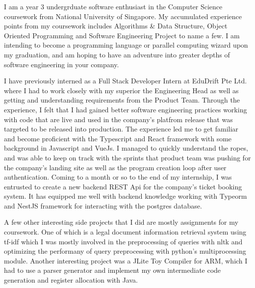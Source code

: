 \documentclass[11pt, a4paper]{awesome-cv}
\begin{document}
\makecvheader[R]


\makelettertitle

\begin{cvletter}

I am a year 3 undergrduate software enthusiast in the Computer Science coursework from National University of Singapore. My accumulated experience points from my coursework includes Algorithms \& Data Structure, Object Oriented Programming and Software Engineering Project to name a few. I am intending to become a programming language or parallel computing wizard upon my graduation, and am hoping to have an adventure into greater depths of software engineering in your company.

I have previously interned as a Full Stack Developer Intern at EduDrift Pte Ltd. where I had to work closely with my superior the Engineering Head as well as getting and understanding requirements from the Product Team. Through the experience, I felt that I had gained better software engineering practices working with code that are live and used in the company's platfrom release that was targeted to be released into production. The experience led me to get familiar and become proficient with the Typescript and React framework with some background in Javascript and VueJs. I managed to quickly understand the ropes, and was able to keep on track with the sprints that product team was pushing for the company's landing site as well as the program creation loop after user authentication. Coming to a month or so to the end of my internship, I was entrusted to create a new backend REST Api for the company's ticket booking system. It has equipped me well with backend knowledge working with Typeorm and NestJS framework for interacting with the postgres database.

A few other interesting side projects that I did are mostly assignments for my coursework. One of which is a legal document information retrieval system using tf-idf which I was mostly involved in the preprocessing of queries with nltk and optimizing the performany of query preprocessing with python's multiprocessing module. Another interesting project was a JLite Toy Compiler for ARM, which I had to use a parser generator and implement my own intermediate code generation and register allocation with Java.


\end{cvletter}
\end{document}

